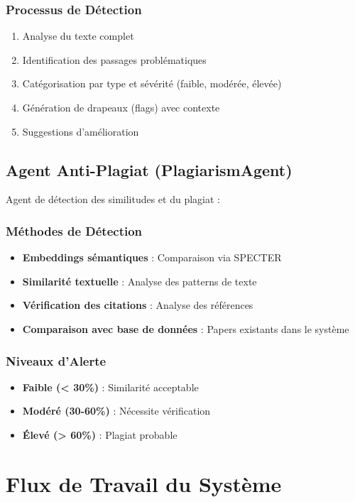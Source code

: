 \documentclass[12pt,a4paper]{article}
\begin{document}
\subsubsection{Processus de Détection}
\begin{enumerate}
    \item Analyse du texte complet
    \item Identification des passages problématiques
    \item Catégorisation par type et sévérité (faible, modérée, élevée)
    \item Génération de drapeaux (flags) avec contexte
    \item Suggestions d'amélioration
\end{enumerate}

\subsection{Agent Anti-Plagiat (PlagiarismAgent)}

Agent de détection des similitudes et du plagiat :

\subsubsection{Méthodes de Détection}
\begin{itemize}
    \item \textbf{Embeddings sémantiques} : Comparaison via SPECTER
    \item \textbf{Similarité textuelle} : Analyse des patterns de texte
    \item \textbf{Vérification des citations} : Analyse des références
    \item \textbf{Comparaison avec base de données} : Papers existants dans le système
\end{itemize}

\subsubsection{Niveaux d'Alerte}
\begin{itemize}
    \item \textbf{Faible (< 30\%)} : Similarité acceptable
    \item \textbf{Modéré (30-60\%)} : Nécessite vérification
    \item \textbf{Élevé (> 60\%)} : Plagiat probable
\end{itemize}

\section{Flux de Travail du Système}
\end{document}
